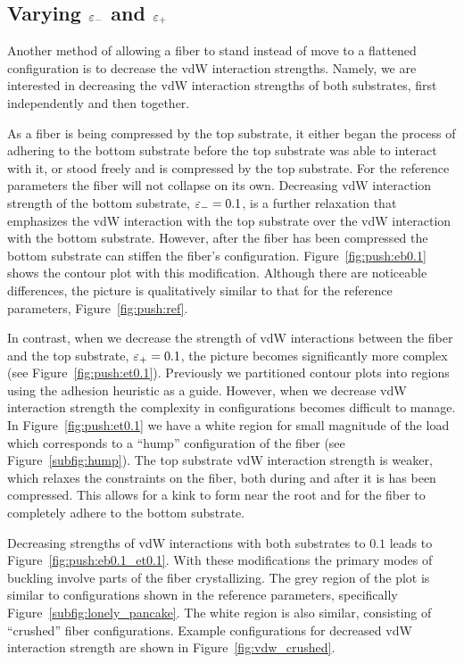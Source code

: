\subsection{Varying $\varepsilon_-$ and $\varepsilon_+$} \label{subsection:push:eps}

Another method of allowing a fiber to stand instead of move to a flattened configuration is to decrease the vdW interaction strengths. Namely, we are interested in decreasing the vdW interaction strengths of both substrates, first independently and then together.

As a fiber is being compressed by the top substrate, it either began the process of adhering to the bottom substrate before the top substrate was able to interact with it, or stood freely and is compressed by the top substrate. For the reference parameters the fiber will not collapse on its own. Decreasing vdW interaction strength of the bottom substrate, $\varepsilon_-=0.1$, is a further relaxation that emphasizes the vdW interaction with the top substrate over the vdW interaction with the bottom substrate. However, after the fiber has been compressed the bottom substrate can stiffen the fiber's configuration. Figure~\ref{fig:push:eb0.1} shows the contour plot with this modification. Although there are noticeable differences, the picture is qualitatively similar to that for the reference parameters, Figure~\ref{fig:push:ref}.

In contrast, when we decrease the strength of vdW interactions between the fiber and the top substrate, $\varepsilon_+=0.1$, the picture becomes significantly more complex (see Figure~\ref{fig:push:et0.1}). Previously we partitioned contour plots into regions using the adhesion heuristic as a guide. However, when we decrease vdW interaction strength the complexity in configurations becomes difficult to manage. In Figure~\ref{fig:push:et0.1} we have a white region for small magnitude of the load which corresponds to a ``hump'' configuration of the fiber (see Figure~\ref{subfig:hump}). The top substrate vdW interaction strength is weaker, which relaxes the constraints on the fiber, both during and after it is has been compressed. This allows for a kink to form near the root and for the fiber to completely adhere to the bottom substrate.

Decreasing strengths of vdW interactions with both substrates to $0.1$ leads to Figure~\ref{fig:push:eb0.1_et0.1}. With these modifications the primary modes of buckling involve parts of the fiber crystallizing. The grey region of the plot is similar to configurations shown in the reference parameters, specifically Figure~\ref{subfig:lonely_pancake}. The white region is also similar, consisting of ``crushed'' fiber configurations. Example configurations for decreased vdW interaction strength are shown in Figure~\ref{fig:vdw_crushed}.
	

